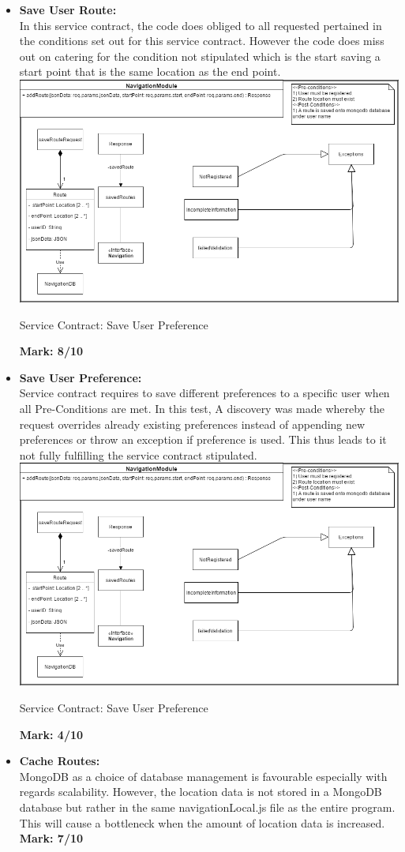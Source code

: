 \begin{itemize}
	
\item \textbf{Save User Route:}\\In this service contract, the code does obliged to all requested pertained in the conditions set out for this service contract. However the code does miss out on catering for the condition not stipulated which is the start saving a start point that is the same location as the end point.\\
\includegraphics[scale=0.5]{SaveRoute.png}
\caption{Service Contract: Save User Preference}
	\textbf{Mark: 8/10}
	
\item \textbf{Save User Preference:}\\Service contract requires to save different preferences to a specific user when all Pre-Conditions are met. In this test, A discovery was made whereby the request overrides already existing preferences instead of appending new preferences or throw an exception if preference is used. This thus leads to it not fully fulfilling the service contract stipulated.\\
\includegraphics[scale=0.5]{SaveRoute.png}
\caption{Service Contract: Save User Preference}
	\textbf{Mark: 4/10}
\item \textbf{Cache Routes:}\\MongoDB as a choice of database management is favourable especially with regards scalability. However, the location data is not stored in a MongoDB database but rather in the same navigationLocal.js file as the entire program. This will cause a bottleneck when the amount of location data is increased.\\
	\textbf{Mark: 7/10}
	
\end{itemize}